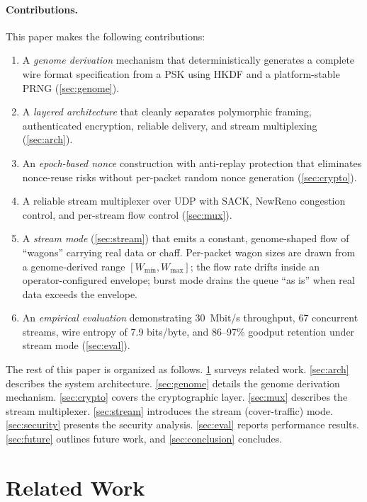 \documentclass[11pt,a4paper]{article}
\let\oldparagraph\paragraph
\renewcommand{\paragraph}[1]{\needspace{5\baselineskip}\oldparagraph{#1}}
\begin{document}
\paragraph{Contributions.} This paper makes the following contributions:
\begin{enumerate}[nosep]
  \item A \emph{genome derivation} mechanism that deterministically generates a complete wire format specification from a PSK using HKDF and a platform-stable PRNG (\cref{sec:genome}).
  \item A \emph{layered architecture} that cleanly separates polymorphic framing, authenticated encryption, reliable delivery, and stream multiplexing (\cref{sec:arch}).
  \item An \emph{epoch-based nonce} construction with anti-replay protection that eliminates nonce-reuse risks without per-packet random nonce generation (\cref{sec:crypto}).
  \item A reliable stream multiplexer over UDP with SACK, NewReno congestion control, and per-stream flow control (\cref{sec:mux}).
  \item A \emph{stream mode} (\cref{sec:stream}) that emits a constant, genome-shaped flow of ``wagons'' carrying real data or chaff. Per-packet wagon sizes are drawn from a genome-derived range $[W_{\min}, W_{\max}]$; the flow rate drifts inside an operator-configured envelope; burst mode drains the queue ``as is'' when real data exceeds the envelope.
  \item An \emph{empirical evaluation} demonstrating 30~Mbit/s throughput, 67 concurrent streams, wire entropy of 7.9 bits/byte, and 86--97\% goodput retention under stream mode (\cref{sec:eval}).
\end{enumerate}

The rest of this paper is organized as follows. \cref{sec:related} surveys related work. \cref{sec:arch} describes the system architecture. \cref{sec:genome} details the genome derivation mechanism. \cref{sec:crypto} covers the cryptographic layer. \cref{sec:mux} describes the stream multiplexer. \cref{sec:stream} introduces the stream (cover-traffic) mode. \cref{sec:security} presents the security analysis. \cref{sec:eval} reports performance results. \cref{sec:future} outlines future work, and \cref{sec:conclusion} concludes.

\section{Related Work}\label{sec:related}
\end{document}
